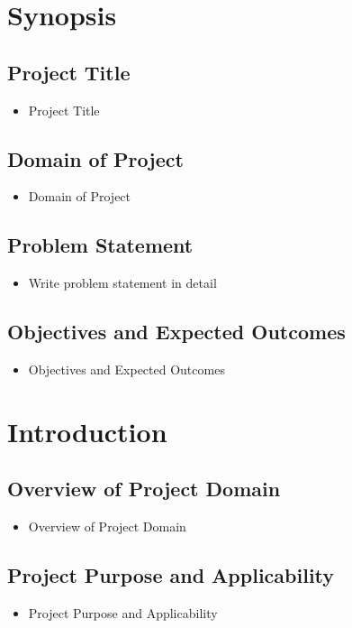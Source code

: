 \documentclass[oneside,a4paper,12pt]{report}
\begin{document}
{ \tableofcontents
 \listoffigures 
 \listoftables




\chapter{Synopsis}
\section{Project Title}
\begin{itemize}
\item Project Title
\end{itemize}


\section{Domain of Project}  
\begin{itemize}
\item Domain of Project
\end{itemize}

\section{Problem Statement}
\begin{itemize}
\item Write problem statement in detail
\end{itemize}

\section{Objectives and Expected Outcomes }  
\begin{itemize}
\item Objectives and Expected Outcomes
\end{itemize}

\chapter{Introduction}
\section{Overview of Project Domain}
\begin{itemize}
\item Overview of Project Domain
\end{itemize}


\section{Project Purpose and Applicability}  
\begin{itemize}
\item Project Purpose and Applicability
\end{itemize}

}
\end{document}
